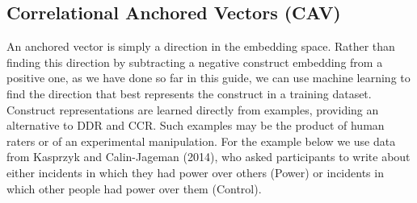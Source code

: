 \documentclass[
  man,
  floatsintext,
  longtable,
  nolmodern,
  notxfonts,
  notimes,
  colorlinks=true,linkcolor=blue,citecolor=blue,urlcolor=blue]{apa7}
\newenvironment{Shaded}{\begin{snugshade}}{\end{snugshade}}
\newcommand{\AttributeTok}[1]{\textcolor[rgb]{0.40,0.45,0.13}{#1}}
\newcommand{\CommentTok}[1]{\textcolor[rgb]{0.37,0.37,0.37}{#1}}
\newcommand{\ConstantTok}[1]{\textcolor[rgb]{0.56,0.35,0.01}{#1}}
\newcommand{\DecValTok}[1]{\textcolor[rgb]{0.68,0.00,0.00}{#1}}
\newcommand{\FunctionTok}[1]{\textcolor[rgb]{0.28,0.35,0.67}{#1}}
\newcommand{\NormalTok}[1]{\textcolor[rgb]{0.00,0.23,0.31}{#1}}
\newcommand{\OtherTok}[1]{\textcolor[rgb]{0.00,0.23,0.31}{#1}}
\newcommand{\SpecialCharTok}[1]{\textcolor[rgb]{0.37,0.37,0.37}{#1}}
\newcommand{\StringTok}[1]{\textcolor[rgb]{0.13,0.47,0.30}{#1}}
\begin{document}
\subsection{Correlational Anchored Vectors
(CAV)}\label{correlational-anchored-vectors-cav}

An anchored vector is simply a direction in the embedding space. Rather
than finding this direction by subtracting a negative construct
embedding from a positive one, as we have done so far in this guide, we
can use machine learning to find the direction that best represents the
construct in a training dataset. Construct representations are learned
directly from examples, providing an alternative to DDR and CCR. Such
examples may be the product of human raters or of an experimental
manipulation. For the example below we use data from Kasprzyk and
Calin-Jageman (2014), who asked participants to write about either
incidents in which they had power over others (Power) or incidents in
which other people had power over them (Control).

\begin{Shaded}
\end{Shaded}
\end{document}
